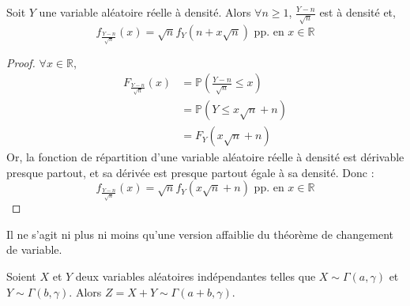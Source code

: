 





	\begin{lemma}
		\label{formule-de-stirling-1}
		Soit $Y$ une variable aléatoire réelle à densité. Alors $\forall n \geq 1$, $\frac{Y - n}{\sqrt{n}}$ est à densité et,
		\[ f_{\frac{Y - n}{\sqrt{n}}}(x) = \sqrt{n} f_{Y}(n + x \sqrt{n}) \text{ pp. en } x \in \mathbb{R} \]
	\end{lemma}

	\begin{proof}
		$\forall x \in \mathbb{R}$,
		\begin{align*}
			F_{\frac{Y - n}{\sqrt{n}}}(x) & = \mathbb{P} \left(\frac{Y - n}{\sqrt{n}} \leq x \right) \\
			&= \mathbb{P} (Y \leq x \sqrt{n} + n) \\
			&= F_Y (x \sqrt{n} + n)
		\end{align*}
		Or, la fonction de répartition d'une variable aléatoire réelle à densité est dérivable presque partout, et sa dérivée est presque partout égale à sa densité. Donc :
		\[ f_{\frac{Y - n}{\sqrt{n}}}(x) = \sqrt{n} f_Y (x \sqrt{n} + n) \text{ pp. en } x \in \mathbb{R} \]
	\end{proof}

	\begin{remark}
		Il ne s'agit ni plus ni moins qu'une version affaiblie du théorème de changement de variable.
	\end{remark}


	\begin{lemma}
		\label{formule-de-stirling-2}
		Soient $X$ et $Y$ deux variables aléatoires indépendantes telles que $X \sim \Gamma(a, \gamma)$ et $Y \sim \Gamma(b, \gamma)$. Alors $Z = X + Y \sim \Gamma(a+b, \gamma)$.
	\end{lemma}

